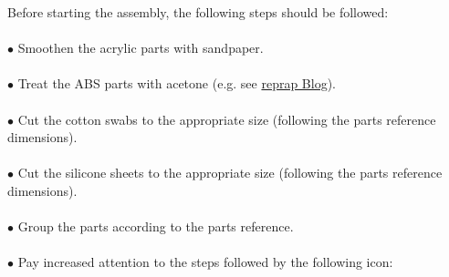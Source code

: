 Before starting the assembly, the following steps should be followed: \\  \\
$\bullet$ Smoothen the acrylic parts with sandpaper. \\ \\
$\bullet$ Treat the ABS parts with acetone (e.g. see \href{http://blog.reprap.org/2013/02/vapor-treating-abs-rp-parts.html}{reprap Blog}).\\ \\
$\bullet$ Cut the cotton swabs to the appropriate size (following the parts reference dimensions). \\ \\
$\bullet$ Cut the silicone sheets to the appropriate size (following the parts reference dimensions). \\ \\
$\bullet$ Group the parts according to the parts reference. \\ \\
$\bullet$ Pay increased attention to the steps followed by the following icon: \circled{!}\\ \\

\begin{center}

\end{center}

